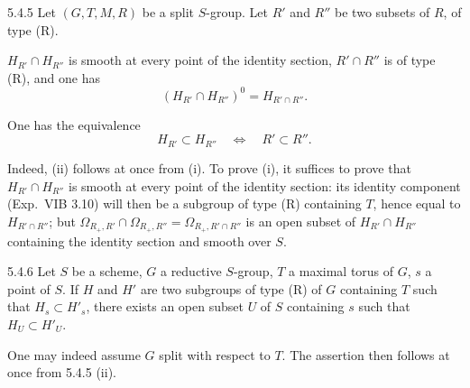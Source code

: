 \begin{proposition}{5.4.5}\label{XXII.5.4.5}
Let $(G,T,M,R)$ be a split $S$-group. Let $R'$ and $R''$ be two subsets of $R$, of type (R).
\begin{enumeratei}
\item $H_{R'}\cap H_{R''}$ is smooth at every point of the identity section, $R'\cap R''$ is of type (R), and one has
\[
(H_{R'}\cap H_{R''})^0=H_{R'\cap R''}.
\]
\item One has the equivalence
\[
H_{R'}\subset H_{R''}\quad\Longleftrightarrow\quad R'\subset R''.
\]
\end{enumeratei}
\end{proposition}
Indeed, (ii) follows at once from (i). To prove (i), it suffices to prove that $H_{R'}\cap H_{R''}$ is smooth at every point of the identity section: its identity component (\cf Exp.~VIB 3.10) will then be a subgroup of type (R) containing $T$, hence equal to $H_{R'\cap R''}$; but $\Omega_{R_+,R'}\cap\Omega_{R_+,R''}=\Omega_{R_+,R'\cap R''}$ is an open subset of $H_{R'}\cap H_{R''}$ containing the identity section and smooth over $S$.
\begin{corollary}{5.4.6}\label{XXII.5.4.6}
Let $S$ be a scheme, $G$ a reductive $S$-group, $T$ a maximal torus of $G$, $s$ a point of $S$. If $H$ and $H'$ are two subgroups of type (R) of $G$ containing $T$ such that $H_s\subset H'_s$, there exists an open subset $U$ of $S$ containing $s$ such that $H_U\subset H'_U$.
\end{corollary}
One may indeed assume $G$ split with respect to $T$. The assertion then follows at once from 5.4.5 (ii).

